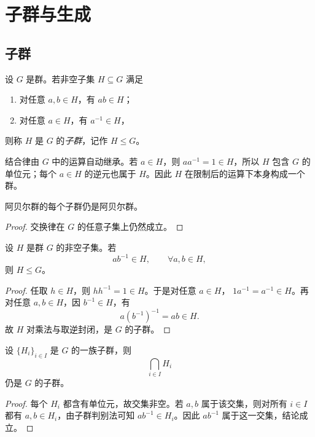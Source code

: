 \chapter{子群与生成}

\section{子群}

\begin{definition}[子群]
设 $G$ 是群。若非空子集 $H\subseteq G$ 满足
\begin{enumerate}
  \item 对任意 $a,b\in H$，有 $ab\in H$；
  \item 对任意 $a\in H$，有 $a^{-1}\in H$，
\end{enumerate}
则称 $H$ 是 $G$ 的\emph{子群}，记作 $H\leq G$。
\end{definition}

结合律由 $G$ 中的运算自动继承。若 $a\in H$，则 $aa^{-1}=1\in H$，所以 $H$ 包含 $G$ 的单位元；每个 $a\in H$ 的逆元也属于 $H$。因此 $H$ 在限制后的运算下本身构成一个群。

\begin{proposition}
阿贝尔群的每个子群仍是阿贝尔群。
\end{proposition}

\begin{proof}
交换律在 $G$ 的任意子集上仍然成立。
\end{proof}

\begin{theorem}[子群判别法]
设 $H$ 是群 $G$ 的非空子集。若
\[
  ab^{-1}\in H,\qquad \forall a,b\in H,
\]
则 $H\leq G$。
\end{theorem}

\begin{proof}
任取 $h\in H$，则 $hh^{-1}=1\in H$。于是对任意 $a\in H$，
$1a^{-1}=a^{-1}\in H$。再对任意 $a,b\in H$，因 $b^{-1}\in H$，有
\[
  a(b^{-1})^{-1}=ab\in H.
\]
故 $H$ 对乘法与取逆封闭，是 $G$ 的子群。
\end{proof}

\begin{theorem}[子群的交]
设 $\{H_i\}_{i\in I}$ 是 $G$ 的一族子群，则
\[
  \bigcap_{i\in I}H_i
\]
仍是 $G$ 的子群。
\end{theorem}

\begin{proof}
每个 $H_i$ 都含有单位元，故交集非空。若 $a,b$ 属于该交集，则对所有 $i\in I$ 都有 $a,b\in H_i$，由子群判别法可知 $ab^{-1}\in H_i$。因此 $ab^{-1}$ 属于这一交集，结论成立。
\end{proof}

